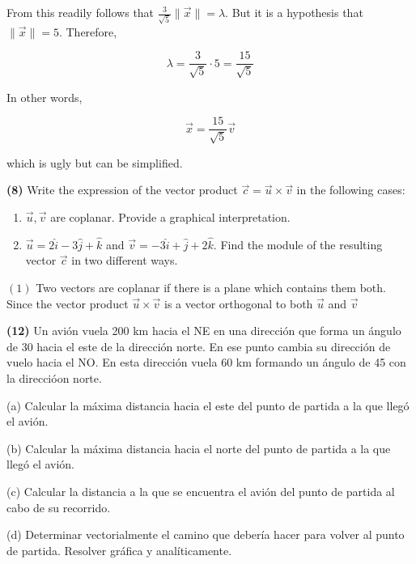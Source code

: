 \documentclass[12pt]{article}
\theoremstyle{definition}
\begin{document}
From this readily follows that $\frac{3}{\sqrt{5} }\|\vec{x}\| = \lambda$. But
it is a hypothesis that $\|\vec{x}\| = 5$. Therefore, 

\begin{equation}
    \lambda = \frac{3}{\sqrt{5} } \cdot 5 = \frac{15}{\sqrt{5} }
\end{equation}

In other words, 

\begin{equation}
    \vec{x} = \frac{15}{\sqrt{5} } \vec{v} 
\end{equation}

which is ugly but can be simplified.


\pagebreak 

\begin{shaded}
    \textbf{(8)} Write the expression of the vector product $\vec{c} = \vec{u}
    \times \vec{v}$ in the following cases: 

    \begin{enumerate}
        \item $\vec{u}, \vec{v}$ are coplanar. Provide a graphical
            interpretation. 
        \item $\vec{u} = 2\hat{i} - 3 \hat{j} + \hat{k}$ and $\vec{v} =
            -3\hat{i} + \hat{j} + 2 \hat{k}$. Find the module of the resulting
            vector $\vec{c}$ in two different ways.
    \end{enumerate}
\end{shaded}

$(1)$ Two vectors are coplanar if there is a plane which contains them both.
Since the vector product $\vec{u} \times \vec{v}$ is a vector orthogonal 
to both $\vec{u}$ and $\vec{v}$


\pagebreak 

\begin{shaded}
    \textbf{(12)} Un avión vuela 200 km hacia el NE en una dirección que forma
    un ángulo de 30 hacia el este de la dirección norte. En ese punto cambia su
    dirección de vuelo hacia el NO. En esta dirección vuela 60 km formando un
    ángulo de 45 con la direccióon norte.

    (a) Calcular la máxima distancia hacia el este del punto de partida a la que
    llegó el avión. 

(b) Calcular la máxima distancia hacia el norte del punto de partida a la que
llegó el avión. 

(c) Calcular la distancia a la que se encuentra el avión del punto de partida al
cabo de su recorrido. 

(d) Determinar vectorialmente el camino que debería hacer para volver al punto
de partida. Resolver gráfica y analíticamente.
\end{shaded}
\end{document}
